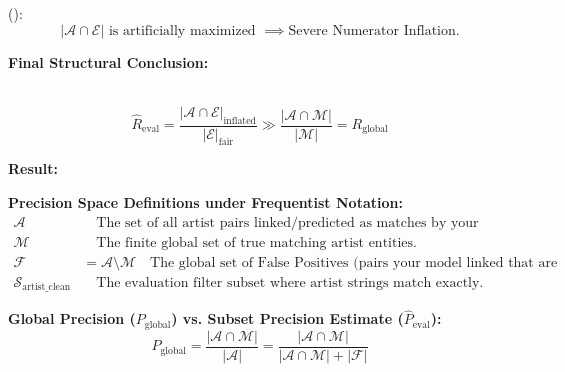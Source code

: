  ():
\begin{equation}

	|\mathcal{A} \cap \mathcal{E}| \text{ is artificially maximized } \implies \text{Severe Numerator Inflation.}
\end{equation}

\textbf{Final Structural Conclusion:}

 \\
\begin{equation}
	\widehat{R}_{\text{eval}} = \frac{|\mathcal{A} \cap \mathcal{E}|_{\text{inflated}}}{|\mathcal{E}|_{\text{fair}}} \gg \frac{|\mathcal{A} \cap \mathcal{M}|}{|\mathcal{M}|} = R_{\text{global}}
\end{equation}

\textbf{Result:} 



\textbf{Precision Space Definitions under Frequentist Notation:}
\begin{align*}
	\mathcal{A}                        & \quad \text{The set of all artist pairs linked/predicted as matches by your model's aggregate pipeline.}                                  \\
	\mathcal{M}                        & \quad \text{The finite global set of true matching artist entities.}                                                                      \\
	\mathcal{F}                        & = \mathcal{A} \setminus \mathcal{M} \quad \text{The global set of False Positives (pairs your model linked that are actually incorrect).} \\
	\mathcal{S}_{\text{artist\_clean}} & \quad \text{The evaluation filter subset where artist strings match exactly.}
\end{align*}

\textbf{Global Precision ($P_{\text{global}}$) vs. Subset Precision Estimate ($\widehat{P}_{\text{eval}}$):}
\begin{equation}
	P_{\text{global}} = \frac{|\mathcal{A} \cap \mathcal{M}|}{|\mathcal{A}|} = \frac{|\mathcal{A} \cap \mathcal{M}|}{|\mathcal{A} \cap \mathcal{M}| + |\mathcal{F}|}
\end{equation}

